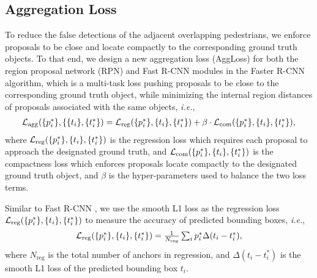 \documentclass[runningheads]{llncs}
\def\ie{{\em i.e.}}
\begin{document}
\subsection{Aggregation Loss}
\label{sec:aggregation-loss}
To reduce the false detections of the adjacent overlapping pedestrians, we enforce proposals to be close and locate compactly to the corresponding ground truth objects. To that end, we design a new aggregation loss (AggLoss) for both the region proposal network (RPN) and Fast R-CNN \cite{DBLP:conf/iccv/Girshick15} modules in the Faster R-CNN algorithm, which is a multi-task loss pushing proposals to be
close to the corresponding ground truth object, while minimizing the internal region distances of proposals associated with the same objects, \ie,
\begin{equation}
\begin{array}{ll}
{\cal L}_{\text{agg}}(\{ p_i^\ast \}, \{\{ t_i \}, \{ t_i^\ast \}) = {\cal L}_{\text{reg}}(\{ p_i^\ast \}, \{ t_i \}, \{ t_i^\ast \}) + \beta \cdot {\cal L}_{\text{com}}(\{ p_i^\ast \}, \{t_i\}, \{t_i^\ast\}),
\end{array}
\label{eq:total-loss}
\end{equation}
where ${\cal L}_{\text{reg}}(\{ p_i^\ast \}, \{ t_i \}, \{ t_i^\ast \})$ is the regression loss which requires each proposal to approach the designated ground truth, and ${\cal L}_{\text{com}}(\{ p_i^\ast \}, \{t_i\}, \{t_i^\ast\})$ is the compactness loss which enforces proposals locate compactly to the designated ground truth object, and $\beta$ is the hyper-parameters used to balance the two loss terms.

Similar to Fast R-CNN \cite{DBLP:conf/iccv/Girshick15}, we use the smooth L1 loss as the regression loss ${\cal L}_{\text{reg}}(\{ p_i^\ast \}, \{t_i\}, \{t_i^\ast\})$ to measure the accuracy of predicted bounding boxes, \ie,
\begin{equation}
\begin{array}{ll}
{\cal L}_{\text{reg}}(\{ p_i^\ast \}, \{ t_i \}, \{ t_i^\ast \})=\frac{1}{N_{\text{reg}}}\sum_{i}p_{i}^\ast\Delta(t_i - t_i^\ast),
\end{array}
\end{equation}
where $N_{\text{reg}}$ is the total number of anchors in regression, and $\Delta(t_i - t_i^\ast)$ is the smooth L1 loss of the predicted bounding box $t_i$.
\end{document}
